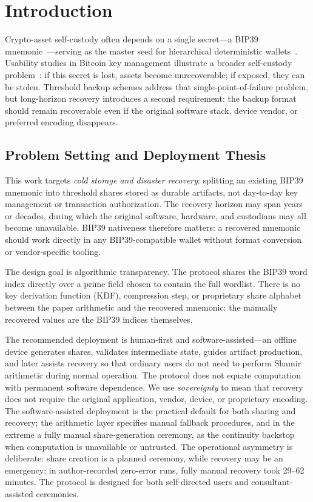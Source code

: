 \documentclass[11pt]{article}
\begin{document}
\section{Introduction}
\label{sec:intro}

Crypto-asset self-custody often depends on a single secret---a BIP39 mnemonic~\cite{bip39}---serving as the master seed for hierarchical deterministic wallets~\cite{bip32}. Usability studies in Bitcoin key management illustrate a broader self-custody problem~\cite{eskandari2015}: if this secret is lost, assets become unrecoverable; if exposed, they can be stolen. Threshold backup schemes address that single-point-of-failure problem, but long-horizon recovery introduces a second requirement: the backup format should remain recoverable even if the original software stack, device vendor, or preferred encoding disappears.

\subsection{Problem Setting and Deployment Thesis}

This work targets \emph{cold storage and disaster recovery}: splitting an existing BIP39 mnemonic into threshold shares stored as durable artifacts, not day-to-day key management or transaction authorization. The recovery horizon may span years or decades, during which the original software, hardware, and custodians may all become unavailable. BIP39 nativeness therefore matters: a recovered mnemonic should work directly in any BIP39-compatible wallet without format conversion or vendor-specific tooling.

The design goal is algorithmic transparency. The protocol shares the BIP39 word index directly over a prime field chosen to contain the full wordlist. There is no key derivation function (KDF), compression step, or proprietary share alphabet between the paper arithmetic and the recovered mnemonic: the manually recovered values are the BIP39 indices themselves.

The recommended deployment is human-first and software-assisted---an offline device generates shares, validates intermediate state, guides artifact production, and later assists recovery so that ordinary users do not need to perform Shamir arithmetic during normal operation. The protocol does not equate computation with permanent software dependence. We use \emph{sovereignty} to mean that recovery does not require the original application, vendor, device, or proprietary encoding. The software-assisted deployment is the practical default for both sharing and recovery; the arithmetic layer specifies manual fallback procedures, and in the extreme a fully manual share-generation ceremony, as the continuity backstop when computation is unavailable or untrusted. The operational asymmetry is deliberate: share creation is a planned ceremony, while recovery may be an emergency; in author-recorded zero-error runs, fully manual recovery took 29--62 minutes. The protocol is designed for both self-directed users and consultant-assisted ceremonies.
\end{document}
